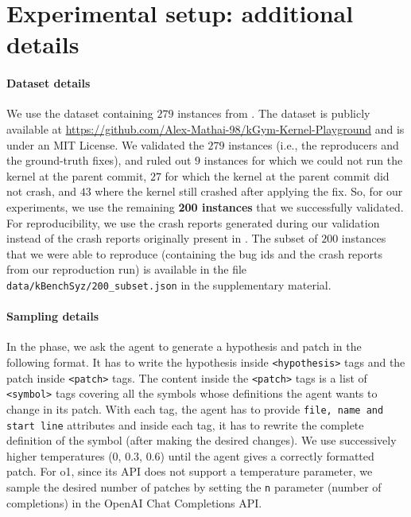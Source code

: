 \section{Experimental setup: additional details} \label{app:details}

\paragraph{Dataset details}
We use the \kbenchsyz{} dataset containing $279$ instances from \citet{kgym}. The dataset is publicly available at \url{https://github.com/Alex-Mathai-98/kGym-Kernel-Playground} and is under an MIT License.
We validated the $279$ instances (i.e., the reproducers and the ground-truth fixes), and ruled out $9$ instances for which we could not run the kernel at the parent commit, $27$ for which the kernel at the parent commit did not crash, and $43$ where the kernel still crashed after applying the fix. So, for our experiments, we use the remaining \textbf{200 instances} that we successfully validated. For reproducibility, we use the crash reports generated during our validation instead of the crash reports originally present in \kbenchsyz{}.
The subset of $200$ instances that we were able to reproduce (containing the bug ids and the crash reports from our reproduction run) is available in the file \texttt{data/kBenchSyz/200\_subset.json} in the supplementary material.

\paragraph{Sampling details}
In the \synthesisphase{} phase, we ask the agent to generate a hypothesis and patch in the following format.
It has to write the hypothesis inside \texttt{<hypothesis>} tags and the patch inside \texttt{<patch>} tags.
The content inside the \texttt{<patch>} tags is a list of \texttt{<symbol>} tags covering all the symbols whose definitions the agent wants to change in its patch.
With each tag, the agent has to provide \texttt{file, name and start line} attributes and inside each tag, it has to rewrite the complete definition of the symbol (after making the desired changes).
We use successively higher temperatures ($0$, $0.3$, $0.6$) until the agent gives a correctly formatted patch.
For o1, since its API does not support a temperature parameter, we sample the desired number of patches by setting the \texttt{n} parameter (number of completions) in the OpenAI Chat Completions API. 


